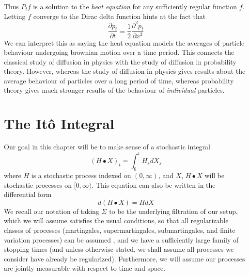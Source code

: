 %
Thus $P_tf$ is a solution to the {\it heat equation} for any sufficiently regular function $f$. Letting $f$ converge to the Dirac delta function hints at the fact that
%
\[ \frac{\partial p_t}{\partial t} = \frac{1}{2} \frac{\partial^2 p_t}{\partial x^2} \]
%
We can interpret this as saying the heat equation models the averages of particle behaviour undergoing brownian motion over a time period. This connects the classical study of diffusion in physics with the study of diffusion in probability theory. However, whereas the study of diffusion in physics gives results about the average behaviour of particles over a long period of time, whereas probability theory gives much stronger results of the behaviour of {\it individual} particles.

\chapter{The It\^{o} Integral}

Our goal in this chapter will be to make sense of a stochastic integral
%
\[ (H \bullet X)_t = \int_0^t H_s dX_s \]
%
where $H$ is a stochastic process indexed on $(0,\infty)$, and $X$, $H \bullet X$ will be stochastic processes on $[0,\infty)$. This equation can also be written in the differential form
%
\[ d(H \bullet X) = H dX \]
%
We recall our notation of taking $\Sigma$ to be the underlying filtration of our setup, which we will assume satisfies the usual conditions, so that all regularizable classes of processes (martingales, supermartingales, submartingales, and finite variation processes) can be assumed \cadlag, and we have a sufficiently large family of stopping times (and unless otherwise stated, we shall assume all processes we consider have already be regularized). Furthermore, we will assume our processes are jointly measurable with respect to time and space.

